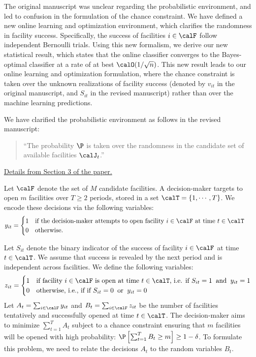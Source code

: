 \documentclass[11pt]{article}
\begin{document}
The original manuscript was unclear regarding the probabilistic environment, and led to confusion in the formulation of the chance constraint. We have defined a new online learning and optimization environment, which clarifies the randomness in facility success. Specifically, the success of facilities $i\in\calF$ follow independent Bernoulli trials. Using this new formalism, we derive our new statistical result, which states that the online classifier converges to the Bayes-optimal classifier at a rate of at best $\calO(1/\sqrt{n})$. This new result leads to our online learning and optimization formulation, where the chance constraint is taken over the unknown realizations of facility success (denoted by $v_{it}$ in the original manuscript, and $S_{it}$ in the revised manuscript) rather than over the machine learning predictions.

We have clarified the probabilistic environment as follows in the revised manuscript:
\begin{quote}
    ``The probability $\P$ is taken over the randomness in the candidate set of available facilities $\calJ_t$.''
\end{quote}

\underline{Details from Section 3 of the paper.}

Let $\calF$ denote the set of $M$ candidate facilities. A decision-maker targets to open $m$ facilities over $T\geq 2$ periods, stored in a set $\calT=\{1,\cdots,T\}$. We encode these decisions via the following variables:
\begin{align*}
    y_{it}&=\begin{cases}
        1&\text{if the decision-maker attempts to open facility $i\in\calF$ at time $t\in\calT$}\\
        0&\text{otherwise.}
    \end{cases}
\end{align*}

Let $S_{it}$ denote the binary indicator of the success of facility $i\in\calF$ at time $t\in\calT$. We assume that success is revealed by the next period and is independent across facilities. We define the following variables:
\begin{equation}\label{eq:z_AE}
    z_{it} = \begin{cases}
        1 & \text{if facility $i\in\calF$ is open at time $t\in\calT$, i.e. if}\ S_{it} = 1 \;\; \text{and}\;\; y_{it}=1\\ 
        0 & \text{otherwise, i.e., if}\ \text{if}\ S_{it} = 0 \;\; \text{or}\;\; y_{it}=0
    \end{cases}
\end{equation}
Let $A_t=\sum_{i\in\calF}y_{it}$ and $B_t=\sum_{i\in\calF}z_{it}$ be the number of facilities tentatively and successfully opened at time $t\in\calT$. The decision-maker aims to minimize $\sum_{t=1}^T A_t$ subject to a chance constraint ensuring that $m$ facilities will be opened with high probability: $\P\left[\sum_{t=1}^TB_t\geq m\right]\geq1-\delta$. To formulate this problem, we need to relate the decisions $A_t$ to the random variables $B_t$.
\end{document}
